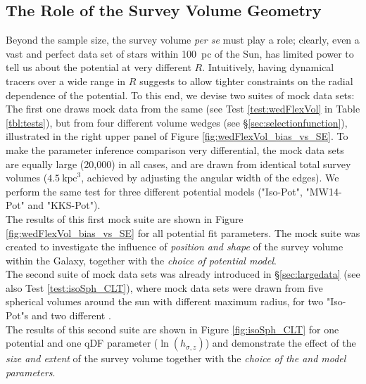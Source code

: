 \subsection{The Role of the Survey Volume Geometry} \label{sec:results_obsvolume}

Beyond the sample size, the survey volume {\it per se} must play a role; clearly, even a vast and perfect data set of stars within 100~pc of the Sun, has limited power to tell us about the potential at very different $R$. Intuitively, having dynamical tracers over a wide range in $R$ suggests to allow tighter constraints on the radial dependence of the potential. To this end, we devise two suites of mock data sets: 
\\The first one draws mock data from the same \pmodel (see Test \ref{test:wedFlexVol} in Table \ref{tbl:tests}), but from four different volume wedges (see \S\ref{sec:selectionfunction}), illustrated in the right upper panel of Figure \ref{fig:wedFlexVol_bias_vs_SE}. To make the parameter inference comparison very differential, the mock data sets are equally large (20,000) in all cases, and are drawn from identical total survey volumes ($4.5~\text{kpc}^3$, achieved by adjusting the angular width of the edges). We perform the same test for three different potential models ("Iso-Pot", "MW14-Pot" and "KKS-Pot").
\\The results of this first mock suite are shown in Figure \ref{fig:wedFlexVol_bias_vs_SE} for all potential fit parameters. The mock suite was created to investigate the influence of \emph{position and shape} of the survey volume within the Galaxy, together with the \emph{choice of potential model}. 
\\The second suite of mock data sets was already introduced in \S\ref{sec:largedata} (see also Test \ref{test:isoSph_CLT}), where mock data sets were drawn from five spherical volumes around the sun with different maximum radius, for two "Iso-Pot"s and two different \MAPs.
\\The results of this second suite are shown in Figure \ref{fig:isoSph_CLT} for one potential and one qDF parameter ($\ln(h_{\sigma,z})$) and demonstrate the effect of the \emph{size and extent} of the survey volume together with the \emph{choice of the \MAP and model parameters}.

